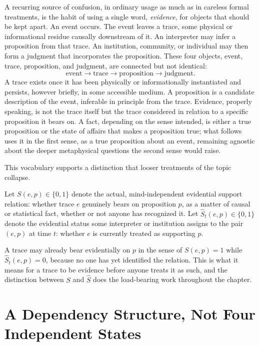 A recurring source of confusion, in ordinary usage as much as in careless formal treatments, is the habit of using a single word, \emph{evidence}, for objects that should be kept apart. An event occurs. The event leaves a trace, some physical or informational residue causally downstream of it. An interpreter may infer a proposition from that trace. An institution, community, or individual may then form a judgment that incorporates the proposition. These four objects, event, trace, proposition, and judgment, are connected but not identical:
\[
\text{event} \longrightarrow \text{trace} \longrightarrow \text{proposition} \longrightarrow \text{judgment}.
\]
A trace exists once it has been physically or informationally instantiated and persists, however briefly, in some accessible medium. A proposition is a candidate description of the event, inferable in principle from the trace. Evidence, properly speaking, is not the trace itself but the trace considered in relation to a specific proposition it bears on. A fact, depending on the sense intended, is either a true proposition or the state of affairs that makes a proposition true; what follows uses it in the first sense, as a true proposition about an event, remaining agnostic about the deeper metaphysical questions the second sense would raise.

This vocabulary supports a distinction that looser treatments of the topic collapse.

\begin{definition}
Let $S(e,p) \in \{0,1\}$ denote the actual, mind-independent evidential support relation: whether trace $e$ genuinely bears on proposition $p$, as a matter of causal or statistical fact, whether or not anyone has recognized it. Let $\widehat{S}_t(e,p) \in \{0,1\}$ denote the evidential status some interpreter or institution assigns to the pair $(e,p)$ at time $t$: whether $e$ is currently treated as supporting $p$.
\end{definition}

A trace may already bear evidentially on $p$ in the sense of $S(e,p)=1$ while $\widehat{S}_t(e,p)=0$, because no one has yet identified the relation. This is what it means for a trace to be evidence before anyone treats it as such, and the distinction between $S$ and $\widehat{S}$ does the load-bearing work throughout the chapter.

\section{A Dependency Structure, Not Four Independent States}

